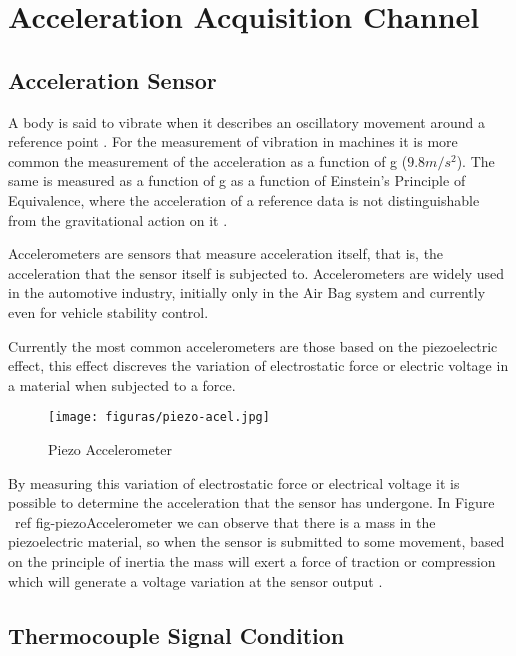 \section{Acceleration Acquisition Channel}
			
	\subsection{Acceleration Sensor}
	
		
		A body is said to vibrate when it describes an oscillatory movement around a reference point \cite{joaocan2000}. For the measurement of vibration in machines it is more common the measurement of the acceleration as a function of g ($9.8m/s^2$). The same is measured as a function of g as a function of Einstein's Principle of Equivalence, where the acceleration of a reference data is not distinguishable from the gravitational action on it \cite{nordtvedt1968equivalence}.
		\par
		Accelerometers are sensors that measure acceleration itself, that is, the acceleration that the sensor itself is subjected to. Accelerometers are widely used in the automotive industry, initially only in the Air Bag system and currently even for vehicle stability control.
		\par
		Currently the most common accelerometers are those based on the piezoelectric effect, this effect discreves the variation of electrostatic force or electric voltage in a material when subjected to a force.

		\begin{figure}[htbp]
			\centering
				\texttt{[image: figuras/piezo-acel.jpg]}
			\caption{Piezo Accelerometer \cite{piezo-accel}}
			\label{fig-piezoAccelerometer}
		\end{figure}

		By measuring this variation of electrostatic force or electrical voltage it is possible to determine the acceleration that the sensor has undergone. In Figure \ ref {fig-piezoAccelerometer} we can observe that there is a mass in the piezoelectric material, so when the sensor is submitted to some movement, based on the principle of inertia the mass will exert a force of traction or compression which will generate a voltage variation at the sensor output \cite{patrick2006}.


	\subsection{Thermocouple Signal Condition}